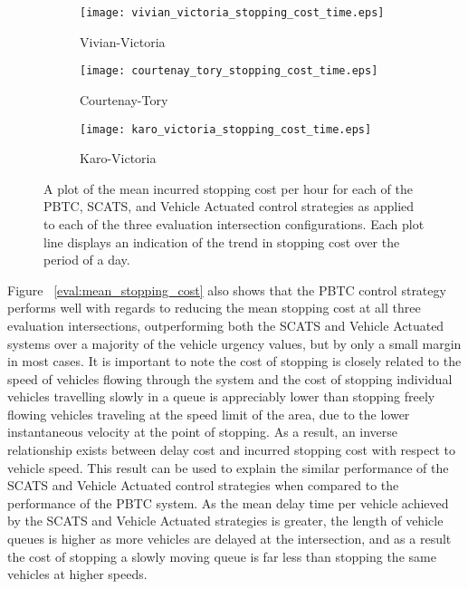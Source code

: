{\begin{figure}
\centering
\begin{subfigure}{.5\textwidth}
  \centering
  \texttt{[image: vivian\_victoria\_stopping\_cost\_time.eps]}
  \caption{Vivian-Victoria}
  \label{stopping_cost_time:sub1}
\end{subfigure}%
\begin{subfigure}{.5\textwidth}
  \centering
  \texttt{[image: courtenay\_tory\_stopping\_cost\_time.eps]}
  \caption{Courtenay-Tory}
  \label{stopping_cost_time:sub2}
\end{subfigure}

\vspace{1cm}

\begin{subfigure}{.5\textwidth}
  \centering
  \texttt{[image: karo\_victoria\_stopping\_cost\_time.eps]}
  \caption{Karo-Victoria}
  \label{stopping_cost_time:sub3}
\end{subfigure}%
\caption{ A plot of the mean incurred stopping cost per hour for each of the PBTC, SCATS, and Vehicle Actuated control strategies as applied to each of the three evaluation intersection configurations. Each plot line displays an indication of the trend in stopping cost over the period of a day.  }
\label{eval:stopping_cost_time }
\end{figure}

Figure ~\ref{eval:mean_stopping_cost} also shows that the PBTC control strategy performs well with regards to reducing the mean stopping cost at all three evaluation intersections, outperforming both the SCATS and Vehicle Actuated systems over a majority of the vehicle urgency values, but by only a small margin in most cases. It is important to note the cost of stopping is closely related to the speed of vehicles flowing through the system and the cost of stopping individual vehicles travelling slowly in a queue is appreciably lower than stopping freely flowing vehicles traveling at the speed limit of the area, due to the lower instantaneous velocity at the point of stopping. As a result, an inverse relationship exists between delay cost and incurred stopping cost with respect to vehicle speed. This result can be used to explain the similar performance of the SCATS and Vehicle Actuated control strategies when compared to the performance of the PBTC system. As the mean delay time per vehicle achieved by the SCATS and Vehicle Actuated strategies is greater, the length of vehicle queues is higher as more vehicles are delayed at the intersection, and as a result the cost of stopping a slowly moving queue is far less than stopping the same vehicles at higher speeds.

}
